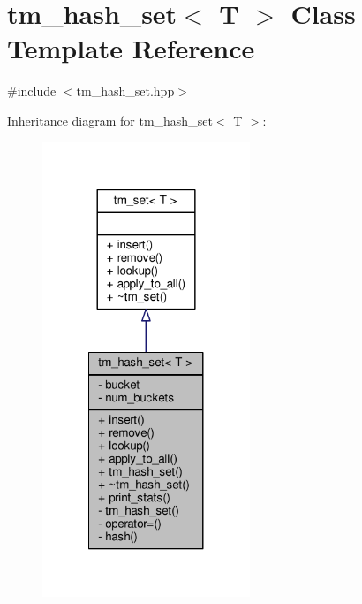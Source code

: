 \hypertarget{classtm__hash__set}{\section{tm\-\_\-hash\-\_\-set$<$ T $>$ Class Template Reference}
\label{classtm__hash__set}
}


{\ttfamily \#include $<$tm\-\_\-hash\-\_\-set.\-hpp$>$}



Inheritance diagram for tm\-\_\-hash\-\_\-set$<$ T $>$\-:
\nopagebreak
\begin{figure}[H]
\begin{center}
\leavevmode
\includegraphics[width=176pt]{classtm__hash__set__inherit__graph}
\end{center}
\end{figure}


